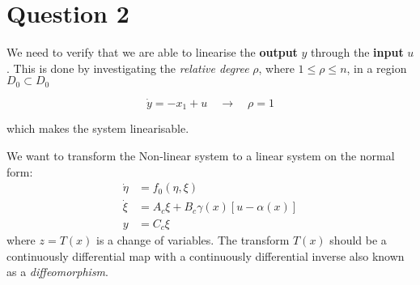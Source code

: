 \chapter{Question 2}

We need to verify that we are able to linearise the \textbf{output} $y$ through the \textbf{input} $u$. This is done by investigating the \textit{relative degree} $\rho$, where $1 \leq \rho \leq n$, in a region $D_0 \subset D_0$

\begin{equation}
        \dot{y} = -x_1 + u \quad \rightarrow \quad \rho = 1
\end{equation}

which makes the system linearisable.

We want to transform the Non-linear system to a linear system on the normal form:
\begin{equation}
        \begin{split}
                \dot{\eta} &= f_0(\eta,\xi) \\
                \dot{\xi} &= A_c \xi + B_c \gamma(x) \left[u - \alpha(x)\right] \\
                y &= C_c \xi
        \end{split}
\end{equation}
where $z = T(x)$ is a change of variables. The transform $T(x)$ should be a continuously differential map with a continuously differential inverse also known as a \textit{diffeomorphism}.

